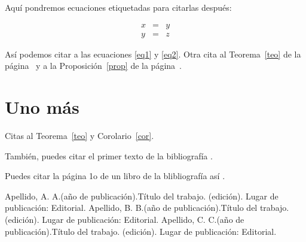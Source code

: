 \documentclass[12pt]{book}%
\theoremstyle{newstyle}%
\begin{document}
Aquí pondremos ecuaciones etiquetadas para citarlas después:

\begin{eqnarray}
x&=&y \label{eq1}\\
y&=&z \label{eq2}
\end{eqnarray}

Así podemos citar a las ecuaciones \eqref{eq1} y \eqref{eq2}. Otra cita al Teorema~\ref{teo} de la página~\pageref{teo} y a la Proposición~\ref{prop} de la página~\pageref{prop}.



\chapter{Uno más}

Citas al Teorema~\ref{teo} y Corolario~\ref{cor}.


También, puedes citar el primer texto de la bibliografía \cite{libro1}.

Puedes citar la página 1o de un libro de la blibliografía así \cite[pág 10]{libro2}.




\begin{thebibliography}{99}

 Apellido, A. A.(año de publicación).Título del trabajo. (edición). Lugar de publicación: Editorial.
 Apellido, B. B.(año de publicación).Título del trabajo. (edición). Lugar de publicación: Editorial.
 Apellido, C. C.(año de publicación).Título del trabajo. (edición). Lugar de publicación: Editorial.

\end{thebibliography}

\printindex
\end{document}
